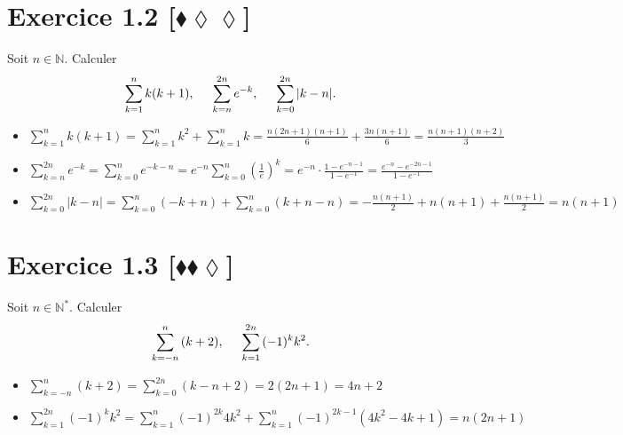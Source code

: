 \documentclass[10pt]{article}
\begin{document}
\section*{Exercice 1.2 [$\blacklozenge\lozenge\lozenge$]}

\begin{tcolorbox}[enhanced, width=6in, center, size=fbox, fontupper=\large, drop shadow southwest]
    Soit $n\in\mathbb{N}$. Calculer
    \begin{equation*}
        \sum\limits^{n}_{k=1}{k(k+1)}, \hspace{0.5cm} \sum\limits^{2n}_{k=n}{e^{-k}}, \hspace{0.5cm} \sum\limits^{2n}_{k=0}{|k-n|}.
    \end{equation*}
    \begin{itemize}
        \item $\sum\limits^n_{k=1}{k(k+1)} = \sum\limits^n_{k=1}{k^2} + \sum\limits^n_{k=1}{k} = \frac{n(2n+1)(n+1)}{6}+\frac{3n(n+1)}{6}=\frac{n(n+1)(n + 2)}{3}$
        \item $\sum\limits^{2n}_{k=n}{e^{-k}} = \sum\limits^{n}_{k=0}{e^{-k-n}}=e^{-n}\sum\limits^{n}_{k=0}{(\frac{1}{e})^k}=e^{-n}\cdot\frac{1-e^{-n-1}}{1-e^{-1}}=\frac{e^{-n}-e^{-2n-1}}{1-e^{-1}}$
        \item $\sum\limits^{2n}_{k=0}{|k-n|}=\sum\limits^{n}_{k=0}{(-k+n)}+\sum\limits^{n}_{k=0}{(k+n-n)}=-\frac{n(n+1)}{2}+n(n+1)+\frac{n(n+1)}{2}=n(n+1)$
    \end{itemize}
\end{tcolorbox}


\section*{Exercice 1.3 [$\blacklozenge\blacklozenge\lozenge$]}

\begin{tcolorbox}[enhanced, width=6in, center, size=fbox, fontupper=\large, drop shadow southwest]
    Soit $n\in\mathbb{N}^*$. Calculer
    \begin{equation*}
        \sum\limits^{n}_{k=-n}{(k+2)}, \hspace{0.5cm} \sum\limits^{2n}_{k=1}{(-1)^kk^2}.
    \end{equation*}
    \begin{itemize}
        \item $\sum\limits^{n}_{k=-n}{(k+2)}=\sum\limits^{2n}_{k=0}{(k-n+2)}=2(2n+1)=4n+2$
        \item $\sum\limits^{2n}_{k=1}{(-1)^kk^2}=\sum\limits^{n}_{k=1}{(-1)^{2k}4k^2}+\sum\limits^{n}_{k=1}{(-1)^{2k-1}(4k^2-4k+1)}=n(2n+1)$
    \end{itemize}
\end{tcolorbox}
\end{document}
